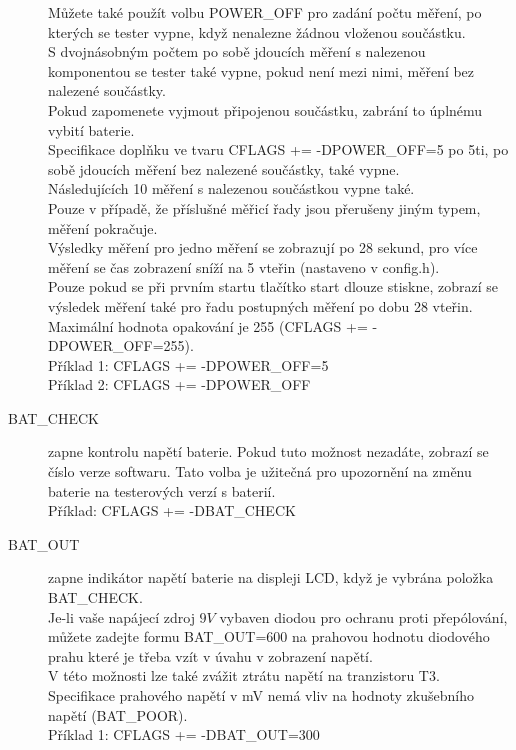 \begin{description}
Můžete také použít volbu POWER\_OFF pro zadání počtu měření, po kterých se tester vypne, když nenalezne žádnou vloženou součástku.\\
S dvojnásobným počtem po sobě jdoucích měření s nalezenou komponentou se tester také vypne,
pokud není mezi nimi, měření bez nalezené součástky.\\
Pokud zapomenete vyjmout připojenou součástku, zabrání to úplnému vybití baterie.\\
Specifikace doplňku ve tvaru  CFLAGS += -DPOWER\_OFF=5 po 5ti, po sobě jdoucích měření bez
nalezené součástky, také vypne.\\ Následujících 10 měření s nalezenou součástkou vypne také.\\
Pouze v případě, že příslušné měřicí řady jsou přerušeny jiným typem, měření pokračuje.\\
Výsledky měření pro jedno měření se zobrazují po 28 sekund, pro více měření se
čas zobrazení sníží na 5 vteřin (nastaveno v config.h).\\
Pouze pokud se při prvním startu tlačítko start dlouze stiskne, zobrazí se výsledek měření
také pro řadu postupných měření po dobu 28 vteřin.\\
Maximální hodnota opakování je 255 (CFLAGS += -DPOWER\_OFF=255).\\
Příklad 1: CFLAGS += -DPOWER\_OFF=5 \\
Příklad 2: CFLAGS += -DPOWER\_OFF 
\vspace{-0,3cm}
  \item[BAT\_CHECK] zapne kontrolu napětí baterie.
  Pokud tuto možnost nezadáte, zobrazí se číslo verze softwaru.
Tato volba je užitečná pro upozornění na změnu baterie na testerových verzí s baterií.\\
Příklad: CFLAGS += -DBAT\_CHECK
\vspace{-0,3cm}
  \item[BAT\_OUT] zapne indikátor napětí baterie na displeji LCD, když je vybrána položka BAT\_CHECK.\\
 Je-li vaše napájecí zdroj \(9V\)  vybaven diodou pro ochranu proti přepólování, můžete
zadejte formu BAT\_OUT=600 na prahovou hodnotu diodového prahu
které je třeba vzít v úvahu v zobrazení napětí.\\
V této možnosti lze také zvážit ztrátu napětí na tranzistoru T3.\\
Specifikace prahového napětí v mV nemá vliv na hodnoty zkušebního napětí (BAT\_POOR).\\
Příklad 1: CFLAGS += -DBAT\_OUT=300 \\

\end{description}
